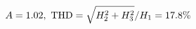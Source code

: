 \documentclass[preview]{standalone}
\begin{document}
\begin{align*}
\special{dvisvgm:raw <g id='unique000'>}A=1.02,\ \text{THD}=\sqrt{H_2^2+H_3^2}/H_1=17.8\%\special{dvisvgm:raw </g>}
\end{align*}
\end{document}
